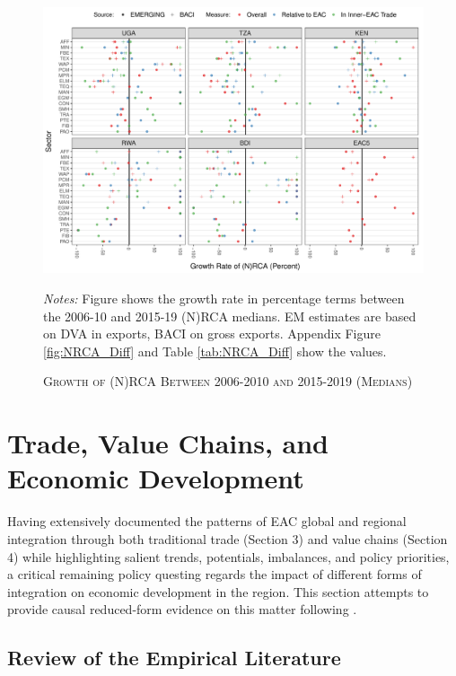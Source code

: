 \documentclass[a4paper]{article}
\begin{document}
\begin{figure}[h!]
\centering
\caption{\label{fig:NRCA_GR}\textsc{Growth of (N)RCA Between 2006-2010 and 2015-2019 (Medians)}}
\includegraphics[width=1\textwidth]{"NRCA_EAC5_ALL_Growth.pdf"} \\ \raggedright
\scriptsize
\emph{Notes:} Figure shows the growth rate in percentage terms between the 2006-10 and 2015-19 (N)RCA medians. EM estimates are based on DVA in exports, BACI on gross exports. Appendix Figure \ref{fig:NRCA_Diff} and Table \ref{tab:NRCA_Diff} show the values. 
\end{figure}
\FloatBarrier



 
 
\section{Trade, Value Chains, and Economic Development}

Having extensively documented the patterns of EAC global and regional integration through both traditional trade (Section 3) and value chains (Section 4) while highlighting salient trends, potentials, imbalances, and policy priorities, a critical remaining policy questing regards the impact of different forms of integration on economic development in the region. This section attempts to provide causal reduced-form evidence on this matter following \citet{Kummritz20161}. 


\subsection{Review of the Empirical Literature}
\end{document}
